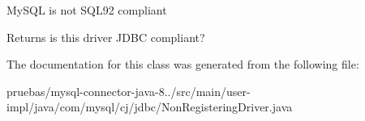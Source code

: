 My\+S\+QL is not S\+Q\+L92 compliant 

\begin{DoxyReturn}{Returns}
is this driver J\+D\+BC compliant? 
\end{DoxyReturn}


The documentation for this class was generated from the following file\+:\begin{DoxyCompactItemize}
\item 
pruebas/mysql-\/connector-\/java-\/8../src/main/user-\/impl/java/com/mysql/cj/jdbc/Non\+Registering\+Driver.\+java\end{DoxyCompactItemize}
